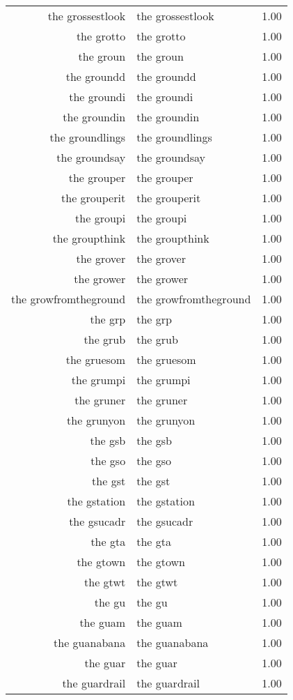 \begin{table}[ht]
\begin{tabular}{rlr}
  the grossestlook & the grossestlook & 1.00 \\ 
  the grotto & the grotto & 1.00 \\ 
  the groun & the groun & 1.00 \\ 
  the groundd & the groundd & 1.00 \\ 
  the groundi & the groundi & 1.00 \\ 
  the groundin & the groundin & 1.00 \\ 
  the groundlings & the groundlings & 1.00 \\ 
  the groundsay & the groundsay & 1.00 \\ 
  the grouper & the grouper & 1.00 \\ 
  the grouperit & the grouperit & 1.00 \\ 
  the groupi & the groupi & 1.00 \\ 
  the groupthink & the groupthink & 1.00 \\ 
  the grover & the grover & 1.00 \\ 
  the grower & the grower & 1.00 \\ 
  the growfromtheground & the growfromtheground & 1.00 \\ 
  the grp & the grp & 1.00 \\ 
  the grub & the grub & 1.00 \\ 
  the gruesom & the gruesom & 1.00 \\ 
  the grumpi & the grumpi & 1.00 \\ 
  the gruner & the gruner & 1.00 \\ 
  the grunyon & the grunyon & 1.00 \\ 
  the gsb & the gsb & 1.00 \\ 
  the gso & the gso & 1.00 \\ 
  the gst & the gst & 1.00 \\ 
  the gstation & the gstation & 1.00 \\ 
  the gsucadr & the gsucadr & 1.00 \\ 
  the gta & the gta & 1.00 \\ 
  the gtown & the gtown & 1.00 \\ 
  the gtwt & the gtwt & 1.00 \\ 
  the gu & the gu & 1.00 \\ 
  the guam & the guam & 1.00 \\ 
  the guanabana & the guanabana & 1.00 \\ 
  the guar & the guar & 1.00 \\ 
  the guardrail & the guardrail & 1.00 \\ 

\end{tabular}
\end{table}
